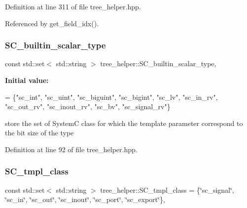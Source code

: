 Definition at line 311 of file tree\+\_\+helper.\+hpp.



Referenced by get\+\_\+field\+\_\+idx().

\mbox{\label{classtree__helper_a958fe44cf137dec46b3201954a839355}} 
\subsubsection{\texorpdfstring{S\+C\+\_\+builtin\+\_\+scalar\+\_\+type}{SC\_builtin\_scalar\_type}}
{\footnotesize\ttfamily const std\+::set$<$ std\+::string $>$ tree\+\_\+helper\+::\+S\+C\+\_\+builtin\+\_\+scalar\+\_\+type\hspace{0.3cm}{\ttfamily [static]}, {\ttfamily [private]}}

{\bfseries Initial value\+:}
\begin{DoxyCode}
= \{\textcolor{stringliteral}{"sc\_int"},   \textcolor{stringliteral}{"sc\_uint"},   \textcolor{stringliteral}{"sc\_biguint"},  \textcolor{stringliteral}{"sc\_bigint"}, \textcolor{stringliteral}{"sc\_lv"},
                                                                   \textcolor{stringliteral}{"sc\_in\_rv"}, \textcolor{stringliteral}{"sc\_out\_rv"}, \textcolor{stringliteral}{"sc\_inout\_rv"}, \textcolor{stringliteral}{
      "sc\_bv"},     \textcolor{stringliteral}{"sc\_signal\_rv"}\}
\end{DoxyCode}


store the set of SystemC class for which the template parameter correspond to the bit size of the type 



Definition at line 92 of file tree\+\_\+helper.\+hpp.

\mbox{\label{classtree__helper_a2ebb2e67cfdb16aa7f9e026c966e4b45}} 
\subsubsection{\texorpdfstring{S\+C\+\_\+tmpl\+\_\+class}{SC\_tmpl\_class}}
{\footnotesize\ttfamily const std\+::set$<$ std\+::string $>$ tree\+\_\+helper\+::\+S\+C\+\_\+tmpl\+\_\+class = \{\char`\"{}sc\+\_\+signal\char`\"{}, \char`\"{}sc\+\_\+in\char`\"{}, \char`\"{}sc\+\_\+out\char`\"{}, \char`\"{}sc\+\_\+inout\char`\"{}, \char`\"{}sc\+\_\+port\char`\"{}, \char`\"{}sc\+\_\+export\char`\"{}\}\hspace{0.3cm}{\ttfamily [static]}, {\ttfamily [private]}}



